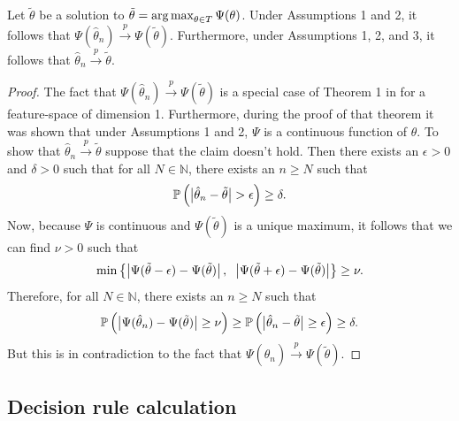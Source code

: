 \begin{lemma}
  \label{lem:univariate-consistency}
  Let $\tilde{\theta}$ be a solution to
  $\tilde{\theta} = \operatorname*{arg\,max}_{\theta \in T} \Psi(\theta)$.  Under Assumptions 1
  and 2, it follows that
  $\Psi(\hat{\theta}_n) \stackrel{p}{\longrightarrow} \Psi(\tilde{\theta})$.
  Furthermore, under Assumptions 1, 2, and 3, it follows that
  $\hat{\theta}_n \stackrel{p}{\longrightarrow} \tilde{\theta}$.
\end{lemma}

\begin{proof}
  The fact that
  $\Psi(\hat{\theta}_n) \stackrel{p}{\longrightarrow} \Psi(\tilde{\theta})$ is a
  special case of Theorem 1 in \cite{hennig2016} for a feature-space of
  dimension 1.  Furthermore, during the proof of that theorem it was shown that
  under Assumptions 1 and 2, $\Psi$ is a continuous function of $\theta$.  To
  show that $\hat{\theta}_n \stackrel{p}{\longrightarrow} \tilde{\theta}$
  suppose that the claim doesn't hold.  Then there exists an $\epsilon > 0$ and
  $\delta > 0$ such that for all $N \in \mathbb{N}$, there exists an $n \geq N$
  such that
  \begin{equation*}
    \mathbb{P}\,\Big(
    \big| \hat{\theta}_n - \tilde{\theta} \big|
    > \epsilon \Big)
    \geq \delta.
  \end{equation*}
  Now, because $\Psi$ is continuous and $\Psi(\tilde{\theta})$ is a unique
  maximum, it follows that we can find $\nu > 0$ such that
  \begin{equation*}
    \min \left\{
      \big| \Psi(\Tilde{\theta} - \epsilon) - \Psi(\tilde{\theta}) \big|\,,
      \hspace{2mm}
      \big| \Psi(\Tilde{\theta} + \epsilon) - \Psi(\tilde{\theta}) \big|
    \right\} \geq \nu.
  \end{equation*}
  Therefore, for all $N \in \mathbb{N}$, there exists an $n \geq N$ such that
  \begin{equation*}
    \mathbb{P}\,\Big(
    \big| \Psi(\hat{\theta}_n) - \Psi(\tilde{\theta}) \big|
    \geq \nu \Big) \geq
    \mathbb{P}\,\Big(
    \big| \hat{\theta}_n - \tilde{\theta} \big|
    \geq \epsilon \Big)
    \geq \delta.
  \end{equation*}
  But this is in contradiction to the fact that
  $\Psi(\hat{\theta}_n) \stackrel{p}{\longrightarrow} \Psi(\tilde{\theta})$.
\end{proof}




\subsection{Decision rule calculation}
\label{sec:empirical-quantile-classifier-results}

